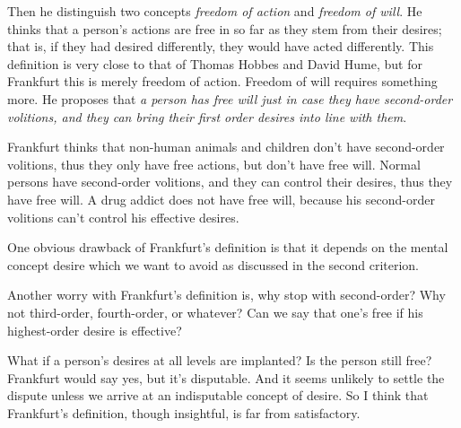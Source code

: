 Then he distinguish two concepts \emph{freedom of action} and \emph{freedom of  will}. He thinks that a person’s actions are free in so far as they stem from their desires; that is, if they had desired differently, they would have acted differently. This definition is very close to that of Thomas Hobbes and David Hume, but for Frankfurt this is merely freedom of action. Freedom of will requires something more. He proposes that \emph{a person has free will just in case they have second-order volitions, and they can bring their first order desires into line with them}.

Frankfurt thinks that non-human animals and children don’t have second-order volitions, thus they only have free actions, but don’t have free will. Normal persons have second-order volitions, and they can control their desires, thus they have free will. A drug addict does not have free will, because his second-order volitions can’t control his effective desires.

One obvious drawback of Frankfurt’s definition is that it depends on the mental concept desire which we want to avoid as discussed in the second criterion.

Another worry with Frankfurt’s definition is, why stop with second-order? Why not third-order, fourth-order, or whatever? Can we say that one’s free if his highest-order desire is effective?

What if a person’s desires at all levels are implanted? Is the person still free? Frankfurt would say yes, but it’s disputable. And it seems unlikely to settle the dispute unless we arrive at an indisputable concept of desire. So I think that Frankfurt’s definition, though insightful, is far from satisfactory.
